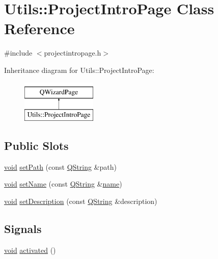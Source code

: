 \hypertarget{class_utils_1_1_project_intro_page}{\section{Utils\-:\-:Project\-Intro\-Page Class Reference}
\label{class_utils_1_1_project_intro_page}
}


{\ttfamily \#include $<$projectintropage.\-h$>$}

Inheritance diagram for Utils\-:\-:Project\-Intro\-Page\-:\begin{figure}[H]
\begin{center}
\leavevmode
\includegraphics[height=2.000000cm]{class_utils_1_1_project_intro_page}
\end{center}
\end{figure}
\subsection*{Public Slots}
\begin{DoxyCompactItemize}
\item 
\hyperlink{group___u_a_v_objects_plugin_ga444cf2ff3f0ecbe028adce838d373f5c}{void} \hyperlink{class_utils_1_1_project_intro_page_a8197a8b196023554b745d037841fa7d9}{set\-Path} (const \hyperlink{group___u_a_v_objects_plugin_gab9d252f49c333c94a72f97ce3105a32d}{Q\-String} \&path)
\item 
\hyperlink{group___u_a_v_objects_plugin_ga444cf2ff3f0ecbe028adce838d373f5c}{void} \hyperlink{class_utils_1_1_project_intro_page_ad9db9a5116385e9f3832d2e19dedc465}{set\-Name} (const \hyperlink{group___u_a_v_objects_plugin_gab9d252f49c333c94a72f97ce3105a32d}{Q\-String} \&\hyperlink{glext_8h_ad977737dfc9a274a62741b9500c49a32}{name})
\item 
\hyperlink{group___u_a_v_objects_plugin_ga444cf2ff3f0ecbe028adce838d373f5c}{void} \hyperlink{class_utils_1_1_project_intro_page_a245a3b785d9fb84b76ed3f3914f87578}{set\-Description} (const \hyperlink{group___u_a_v_objects_plugin_gab9d252f49c333c94a72f97ce3105a32d}{Q\-String} \&description)
\end{DoxyCompactItemize}
\subsection*{Signals}
\begin{DoxyCompactItemize}
\item 
\hyperlink{group___u_a_v_objects_plugin_ga444cf2ff3f0ecbe028adce838d373f5c}{void} \hyperlink{class_utils_1_1_project_intro_page_a8f3e6160911156b2d04e841f7f1bcf13}{activated} ()
\end{DoxyCompactItemize}
